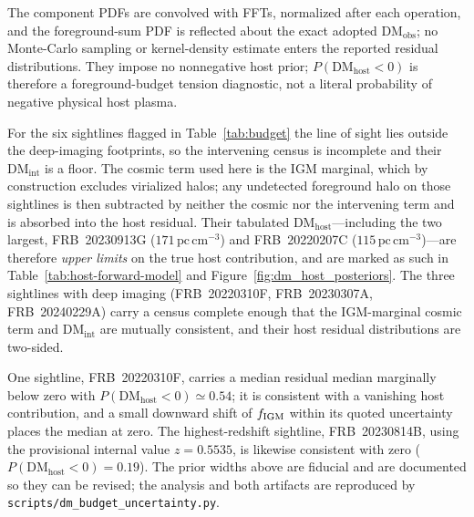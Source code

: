 The component PDFs are convolved with FFTs, normalized after each operation,
and the foreground-sum PDF is reflected about the exact adopted
$\mathrm{DM_{obs}}$; no Monte-Carlo sampling or kernel-density estimate enters
the reported residual distributions. They impose no nonnegative host prior;
$P(\mathrm{DM_{host}}<0)$ is therefore a foreground-budget tension diagnostic,
not a literal probability of negative physical host plasma.

For the six sightlines flagged  in Table~\ref{tab:budget} the
line of sight lies outside the deep-imaging footprints, so the intervening census
is incomplete and their $\mathrm{DM_{int}}$ is a floor. The cosmic term used here
is the IGM marginal, which by construction excludes virialized halos; any
undetected foreground halo on those sightlines is then subtracted by neither the
cosmic nor the intervening term and is absorbed into the host residual. Their
tabulated $\mathrm{DM_{host}}$---including the two largest, FRB~20230913G
($171\,\mathrm{pc\,cm^{-3}}$) and FRB~20220207C
($115\,\mathrm{pc\,cm^{-3}}$)---are therefore \emph{upper limits} on the true host
contribution, and are marked as such in Table~\ref{tab:host-forward-model} and
Figure~\ref{fig:dm_host_posteriors}. The three sightlines with deep imaging
(FRB~20220310F, FRB~20230307A, FRB~20240229A) carry a census complete enough that
the IGM-marginal cosmic term and $\mathrm{DM_{int}}$ are mutually consistent, and
their host residual distributions are two-sided.

One sightline, FRB~20220310F, carries a median
residual median marginally below zero with $P(\mathrm{DM_{host}}<0)\simeq0.54$; it
is consistent with a vanishing host contribution, and a small downward shift
of $f_{\rm IGM}$ within its quoted uncertainty places the median at zero. The
highest-redshift sightline,
FRB~20230814B, using the provisional internal value $z=0.5535$, is likewise
consistent with zero
($P(\mathrm{DM_{host}}<0)=0.19$). The prior widths above are fiducial
and are documented so they can be revised; the analysis and both artifacts are
reproduced by \texttt{scripts/dm\_budget\_uncertainty.py}.

